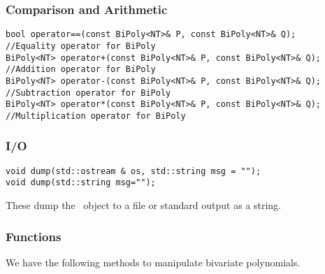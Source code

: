 \subsubsection{Comparison and Arithmetic}
\begin{progb}{
\> \tt bool operator==(const BiPoly<NT>\& P, const BiPoly<NT>\& Q);\\
\> \> //Equality operator for BiPoly\\
\> \tt BiPoly<NT> operator+(const BiPoly<NT>\& P, const BiPoly<NT>\& Q);\\
\> \> //Addition operator for BiPoly\\
\> \tt BiPoly<NT> operator-(const BiPoly<NT>\& P, const BiPoly<NT>\& Q);\\
\> \> //Subtraction operator for BiPoly\\
\> \tt BiPoly<NT> operator*(const BiPoly<NT>\& P, const BiPoly<NT>\& Q);\\
\> \> //Multiplication operator for BiPoly
}\end{progb}

\subsubsection{I/O}

\begin{progb}{
\> \tt  void dump(std::ostream \& os, std::string msg = "");\\
\> \tt  void dump(std::string msg="");\\
}\end{progb}

These dump the \BiPoly\ object to a file or standard output as a string.

\subsubsection{Functions}

We have the following methods to manipulate bivariate polynomials.

